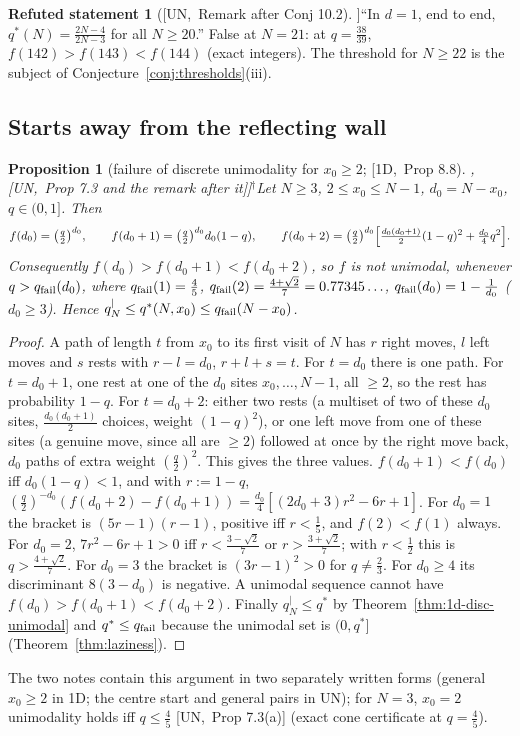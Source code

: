 \documentclass[10pt,a4paper]{article}
\theoremstyle{plain}
\newtheorem{proposition}[theorem]{Proposition}
\theoremstyle{definition}
\newtheorem{refuted}[theorem]{Refuted statement}
\newcommand{\NEW}{\ensuremath{^{\dagger}}}       %
\newcommand{\src}[2]{[\textsf{#1},~#2]}           %
\newcommand{\ONE}{\textsf{1D}}
\newcommand{\UNI}{\textsf{UN}}
\newcommand{\qseg}{q^{|}_N}
\begin{document}
\begin{refuted}[\src{\UNI}{Remark after Conj 10.2}]\label{ref:thr20}
``In $d=1$, end to end, $q^*(N)=\frac{2N-4}{2N-3}$ for all $N\ge20$.'' False at $N=21$: at $q=\frac{38}{39}$, $f(142)>f(143)<f(144)$ (exact integers). The threshold for $N\ge22$ is the subject of Conjecture~\ref{conj:thresholds}(iii).
\end{refuted}

\subsection{Starts away from the reflecting wall}

\begin{proposition}[failure of discrete unimodality for $x_0\ge2$; \src{\ONE}{Prop 8.8}, \src{\UNI}{Prop 7.3 and the remark after it}]\NEW\label{prop:startfail}
Let $N\ge3$, $2\le x_0\le N-1$, $d_0=N-x_0$, $q\in(0,1]$. Then
\[
f(d_0)=\bigl(\tfrac q2\bigr)^{d_0},\qquad f(d_0+1)=\bigl(\tfrac q2\bigr)^{d_0}d_0(1-q),\qquad f(d_0+2)=\bigl(\tfrac q2\bigr)^{d_0}\Bigl[\tfrac{d_0(d_0+1)}2(1-q)^2+\tfrac{d_0}4q^2\Bigr].
\]
Consequently $f(d_0)>f(d_0+1)<f(d_0+2)$, so $f$ is not unimodal, whenever $q>q_{\rm fail}(d_0)$, where $q_{\rm fail}(1)=\frac45$, $q_{\rm fail}(2)=\frac{4+\sqrt2}7=0.77345\ldots$, $q_{\rm fail}(d_0)=1-\frac1{d_0}$ ($d_0\ge3$). Hence $\qseg\le q^*(N,x_0)\le q_{\rm fail}(N-x_0)$.
\end{proposition}
\begin{proof}
A path of length $t$ from $x_0$ to its first visit of $N$ has $r$ right moves, $l$ left moves and $s$ rests with $r-l=d_0$, $r+l+s=t$. For $t=d_0$ there is one path. For $t=d_0+1$, one rest at one of the $d_0$ sites $x_0,\dots,N-1$, all $\ge2$, so the rest has probability $1-q$. For $t=d_0+2$: either two rests (a multiset of two of these $d_0$ sites, $\frac{d_0(d_0+1)}2$ choices, weight $(1-q)^2$), or one left move from one of these sites (a genuine move, since all are $\ge2$) followed at once by the right move back, $d_0$ paths of extra weight $(\frac q2)^2$. This gives the three values. $f(d_0+1)<f(d_0)$ iff $d_0(1-q)<1$, and with $r:=1-q$, $(\frac q2)^{-d_0}(f(d_0+2)-f(d_0+1))=\frac{d_0}4[(2d_0+3)r^2-6r+1]$. For $d_0=1$ the bracket is $(5r-1)(r-1)$, positive iff $r<\frac15$, and $f(2)<f(1)$ always. For $d_0=2$, $7r^2-6r+1>0$ iff $r<\frac{3-\sqrt2}7$ or $r>\frac{3+\sqrt2}7$; with $r<\frac12$ this is $q>\frac{4+\sqrt2}7$. For $d_0=3$ the bracket is $(3r-1)^2>0$ for $q\ne\frac23$. For $d_0\ge4$ its discriminant $8(3-d_0)$ is negative. A unimodal sequence cannot have $f(d_0)>f(d_0+1)<f(d_0+2)$. Finally $\qseg\le q^*$ by Theorem~\ref{thm:1d-disc-unimodal} and $q^*\le q_{\rm fail}$ because the unimodal set is $(0,q^*]$ (Theorem~\ref{thm:laziness}).
\end{proof}
The two notes contain this argument in two separately written forms (general $x_0\ge2$ in \ONE; the centre start and general pairs in \UNI); for $N=3$, $x_0=2$ unimodality holds iff $q\le\frac45$ \src{\UNI}{Prop 7.3(a)} (exact cone certificate at $q=\frac45$).
\end{document}

